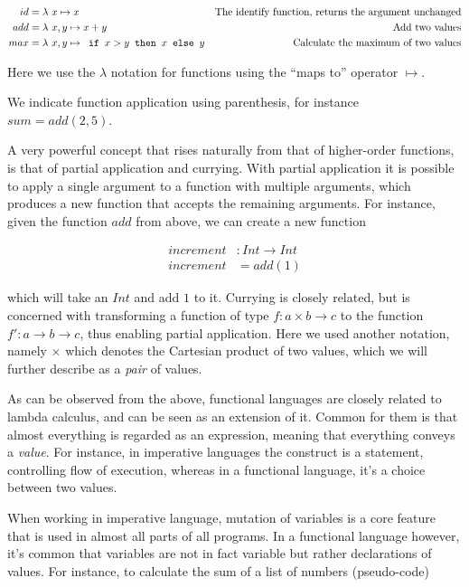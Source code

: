 \begin{align*}
id &= \lambda{} \ x \mapsto{} x & \text{The identify function, returns the argument unchanged}\\
add &= \lambda{} \  x, y  \mapsto{}  x + y   & \text{Add two values}\\
max &= \lambda{} \  x, y  \mapsto{}  \texttt{ if } x > y \texttt{ then } x \texttt{ else } y   & \text{Calculate the maximum of two values}\\
\end{align*}

Here we use the $\lambda$ notation for functions using the ``maps to'' operator $\mapsto$.

We indicate function application using parenthesis, for instance $sum = add(2, 5)$.

A very powerful concept that rises naturally from that of higher-order functions, is that of partial application and currying. With partial application it is possible to apply a single argument to a function with multiple arguments, which produces a new function that accepts the remaining arguments. For instance, given the function $add$ from above, we can create a new function 

\begin{align*}
increment &: Int \to Int\\
increment &= add(1)
\end{align*}

which will take an $Int$ and add $1$ to it. Currying is closely related, but is concerned with transforming a function of type $f : a \times b \to c$ to the function $f' : a \to b \to c$, thus enabling partial application. Here we used another notation, namely $\times$ which denotes the Cartesian product of two values, which we will further describe as a \emph{pair} of values.

As can be observed from the above, functional languages are closely related to lambda calculus, and can be seen as an extension of it. Common for them is that almost everything is regarded as an expression, meaning that everything conveys a \emph{value}. For instance, in imperative languages the  construct is a statement, controlling flow of execution, whereas in a functional language, it's a choice between two values.

When working in imperative language, mutation of variables is a core feature that is used in almost all parts of all programs. In a functional language however, it's common that variables are not in fact variable but rather declarations of values. For instance, to calculate the sum of a list of numbers (pseudo-code)

